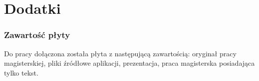 \documentclass[14pt,a4paper,twoside,openright,titlepage]{extbook}
\begin{document}
    \part*{Dodatki}
        \section*{Zawartość płyty}
            Do pracy dołączona została płyta z następującą zawartością: oryginał pracy magisterskiej, pliki źródłowe aplikacji, prezentacja, praca magisterska posiadająca tylko tekst.
        \listoffigures
        \listoftables
        \lstlistoflistings
\end{document}
